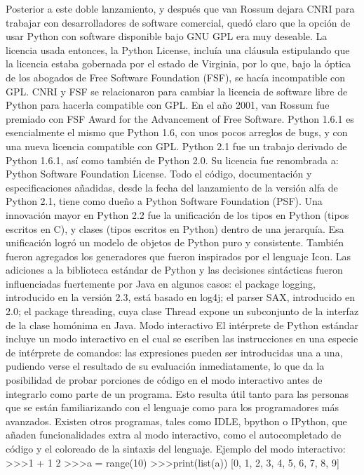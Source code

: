 \documentclass[12pt]{article}
\begin{document}
Posterior a este doble lanzamiento, y después que van Rossum dejara CNRI para trabajar con desarrolladores de software comercial, quedó claro que la opción de usar Python con software disponible bajo GNU GPL era muy deseable. La licencia usada entonces, la Python License, incluía una cláusula estipulando que la licencia estaba gobernada por el estado de Virginia, por lo que, bajo la óptica de los abogados de Free Software Foundation (FSF), se hacía incompatible con GPL. CNRI y FSF se relacionaron para cambiar la licencia de software libre de Python para hacerla compatible con GPL. En el año 2001, van Rossum fue premiado con FSF Award for the Advancement of Free Software.
Python 1.6.1 es esencialmente el mismo que Python 1.6, con unos pocos arreglos de bugs, y con una nueva licencia compatible con GPL.
Python 2.1 fue un trabajo derivado de Python 1.6.1, así como también de Python 2.0. Su licencia fue renombrada a: Python Software Foundation License. Todo el código, documentación y especificaciones añadidas, desde la fecha del lanzamiento de la versión alfa de Python 2.1, tiene como dueño a Python Software Foundation (PSF).
Una innovación mayor en Python 2.2 fue la unificación de los tipos en Python (tipos escritos en C), y clases (tipos escritos en Python) dentro de una jerarquía. Esa unificación logró un modelo de objetos de Python puro y consistente. También fueron agregados los generadores que fueron inspirados por el lenguaje Icon.
Las adiciones a la biblioteca estándar de Python y las decisiones sintácticas fueron influenciadas fuertemente por Java en algunos casos: el package logging, introducido en la versión 2.3, está basado en log4j; el parser SAX, introducido en 2.0; el package threading, cuya clase Thread expone un subconjunto de la interfaz de la clase homónima en Java.
Modo interactivo
El intérprete de Python estándar incluye un modo interactivo en el cual se escriben las instrucciones en una especie de intérprete de comandos: las expresiones pueden ser introducidas una a una, pudiendo verse el resultado de su evaluación inmediatamente, lo que da la posibilidad de probar porciones de código en el modo interactivo antes de integrarlo como parte de un programa. Esto resulta útil tanto para las personas que se están familiarizando con el lenguaje como para los programadores más avanzados.
Existen otros programas, tales como IDLE, bpython o IPython, que añaden funcionalidades extra al modo interactivo, como el autocompletado de código y el coloreado de la sintaxis del lenguaje.
Ejemplo del modo interactivo:
\textgreater\textgreater\textgreater 1 + 1
2
\textgreater\textgreater\textgreater a = range(10)
\textgreater\textgreater\textgreater print(list(a))
[0, 1, 2, 3, 4, 5, 6, 7, 8, 9]
\cite{Wikipedia1WebSite}
\end{document}
